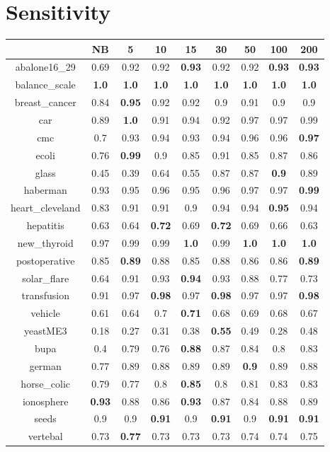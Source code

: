 \documentclass{article}%
\begin{document}
%
\section*{Sensitivity}%
\begin{tabular}{c|cccccccc}%
\hline%
&NB&5&10&15&30&50&100&200\\%
\hline%
abalone16\_29&0.69&0.92&0.92&\textbf{0.93}&0.92&0.92&\textbf{0.93}&\textbf{0.93}\\%
\hline%
balance\_scale&\textbf{1.0}&\textbf{1.0}&\textbf{1.0}&\textbf{1.0}&\textbf{1.0}&\textbf{1.0}&\textbf{1.0}&\textbf{1.0}\\%
\hline%
breast\_cancer&0.84&\textbf{0.95}&0.92&0.92&0.9&0.91&0.9&0.9\\%
\hline%
car&0.89&\textbf{1.0}&0.91&0.94&0.92&0.97&0.97&0.99\\%
\hline%
cmc&0.7&0.93&0.94&0.93&0.94&0.96&0.96&\textbf{0.97}\\%
\hline%
ecoli&0.76&\textbf{0.99}&0.9&0.85&0.91&0.85&0.87&0.86\\%
\hline%
glass&0.45&0.39&0.64&0.55&0.87&0.87&\textbf{0.9}&0.89\\%
\hline%
haberman&0.93&0.95&0.96&0.95&0.96&0.97&0.97&\textbf{0.99}\\%
\hline%
heart\_cleveland&0.83&0.91&0.91&0.9&0.94&0.94&\textbf{0.95}&0.94\\%
\hline%
hepatitis&0.63&0.64&\textbf{0.72}&0.69&\textbf{0.72}&0.69&0.66&0.63\\%
\hline%
new\_thyroid&0.97&0.99&0.99&\textbf{1.0}&0.99&\textbf{1.0}&\textbf{1.0}&\textbf{1.0}\\%
\hline%
postoperative&0.85&\textbf{0.89}&0.88&0.85&0.88&0.86&0.86&\textbf{0.89}\\%
\hline%
solar\_flare&0.64&0.91&0.93&\textbf{0.94}&0.93&0.88&0.77&0.73\\%
\hline%
transfusion&0.91&0.97&\textbf{0.98}&0.97&\textbf{0.98}&0.97&0.97&\textbf{0.98}\\%
\hline%
vehicle&0.61&0.64&0.7&\textbf{0.71}&0.68&0.69&0.68&0.67\\%
\hline%
yeastME3&0.18&0.27&0.31&0.38&\textbf{0.55}&0.49&0.28&0.48\\%
\hline%
bupa&0.4&0.79&0.76&\textbf{0.88}&0.87&0.84&0.8&0.83\\%
\hline%
german&0.77&0.89&0.88&0.89&0.89&\textbf{0.9}&0.89&0.88\\%
\hline%
horse\_colic&0.79&0.77&0.8&\textbf{0.85}&0.8&0.81&0.83&0.83\\%
\hline%
ionosphere&\textbf{0.93}&0.88&0.86&\textbf{0.93}&0.87&0.84&0.88&0.89\\%
\hline%
seeds&0.9&0.9&\textbf{0.91}&0.9&\textbf{0.91}&0.9&\textbf{0.91}&\textbf{0.91}\\%
\hline%
vertebal&0.73&\textbf{0.77}&0.73&0.73&0.73&0.74&0.74&0.75\\%
\hline%
\end{tabular}
\end{document}
